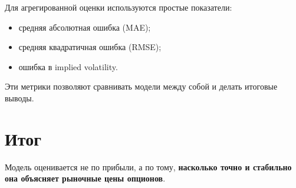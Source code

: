 \documentclass[12pt]{article}
\begin{document}
Для агрегированной оценки используются простые показатели:

\begin{itemize}
    \item средняя абсолютная ошибка (MAE);
    \item средняя квадратичная ошибка (RMSE);
    \item ошибка в implied volatility.
\end{itemize}

Эти метрики позволяют сравнивать модели между собой и делать итоговые выводы.

\section*{Итог}

Модель оценивается не по прибыли, а по тому, \textbf{насколько точно и стабильно она объясняет рыночные цены опционов}.
\end{document}
